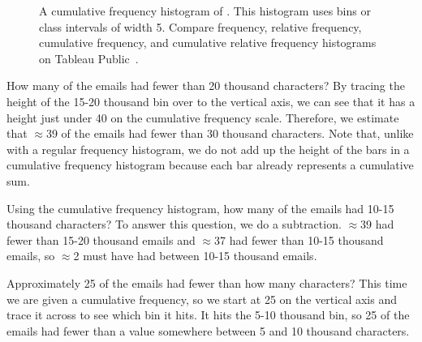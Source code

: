 \begin{figure}[h]
   \centering
{}
   \caption{A cumulative frequency histogram of . This histogram uses bins or class intervals of width 5.  Compare frequency, relative frequency, cumulative frequency, and cumulative relative frequency histograms on Tableau Public~.}
   \label{email50NumCharCumulativeFreqHist}
\end{figure}

\begin{examplewrap}
\begin{nexample}{How many of the emails had fewer than 20 thousand characters?}
By tracing the height of the 15-20 thousand bin over to the vertical axis, we can see that it has a height just under 40 on the cumulative frequency scale. Therefore, we estimate that $\approx$39 of the emails had fewer than 30 thousand characters. Note that, unlike with a regular frequency histogram, we do not add up the height of the bars in a cumulative frequency histogram because each bar already represents a cumulative sum.
\end{nexample}
\end{examplewrap}

\begin{examplewrap}
\begin{nexample}{Using the cumulative frequency histogram, how many of the emails had 10-15 thousand characters?}
To answer this question, we do a subtraction. $\approx$39 had fewer than 15-20 thousand emails and $\approx$37 had fewer than 10-15 thousand emails, so $\approx$2 must have had between 10-15 thousand emails.
\end{nexample}
\end{examplewrap}

\begin{examplewrap}
\begin{nexample}{Approximately 25 of the emails had fewer than how many characters?}
This time we are given a cumulative frequency, so we start at 25 on the vertical axis and trace it across to see which bin it hits. It hits the 5-10 thousand bin, so 25 of the emails had fewer than a value somewhere between 5 and 10 thousand characters.
\end{nexample}
\end{examplewrap}

\D{\newpage}

